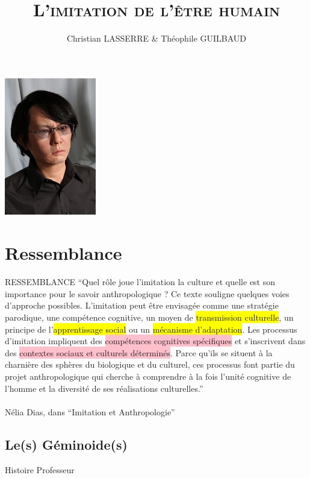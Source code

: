 \documentclass{beamer}
\title{\textsc{L'imitation de l'être humain}}
\author{Christian LASSERRE \& Théophile GUILBAUD}
\date{}
\begin{document}
\begin{frame}
  \titlepage
  {
    \vspace*{-1cm}
    \begin{center} \includegraphics[width=40mm]{data/HI-4} \end{center}
  }
\end{frame}

\begin{frame}
  \tableofcontents
\end{frame}

\section{Ressemblance}
\begin{frame}{RESSEMBLANCE}
  ``Quel rôle joue l’imitation la culture et quelle est son importance pour le savoir anthropologique ? Ce texte souligne quelques voies d’approche possibles. L’imitation peut être envisagée comme une stratégie parodique, une compétence cognitive, un moyen de \colorbox{yellow}{transmission culturelle}, un principe de l’\colorbox{yellow}{apprentissage social} ou un \colorbox{yellow}{mécanisme d’adaptation}. Les processus d’imitation impliquent des \colorbox{pink}{compétences cognitives spécifiques} et s’inscrivent dans des \colorbox{pink}{contextes sociaux et culturels déterminés}. Parce qu’ils se situent à la charnière des sphères du biologique et du culturel, ces processus font partie du projet anthropologique qui cherche à comprendre à la fois l’unité cognitive de l’homme et la diversité de ses réalisations culturelles.''
  ~\\~\\
  {\small Nélia Dias, dans ``Imitation et Anthropologie''}
  
\end{frame}

\subsection{Le(s) Géminoide(s)}
\begin{frame}{Histoire}
  Professeur
\end{frame}
\end{document}

